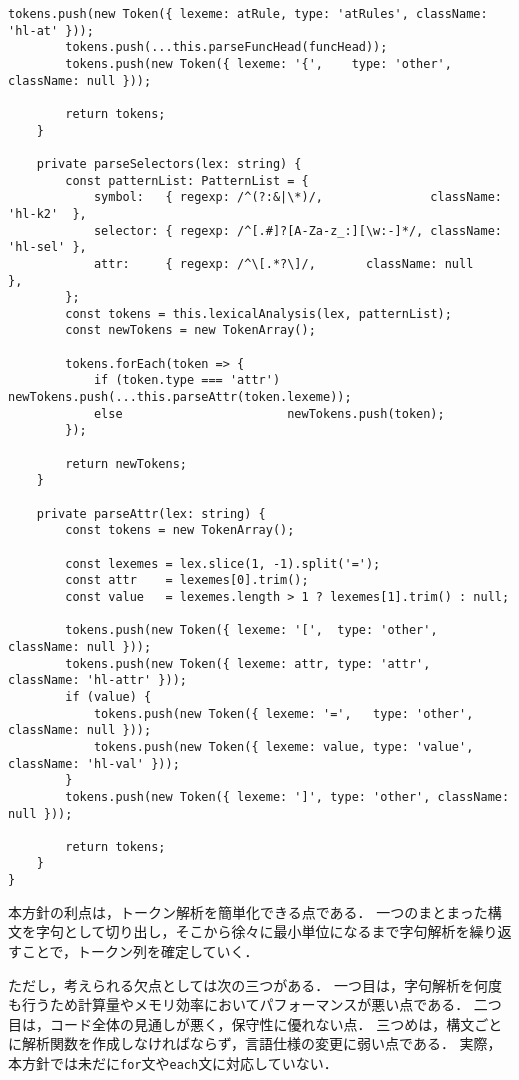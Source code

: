 \documentclass[autodetect-engine,dvi=dvipdfmx,ja=standard,
               a4j,11pt]{bxjsarticle}
\begin{document}
\begin{lstlisting}[caption={CSS/SCSSハイライタ({\tt scss.ts})(1)}, label={prog:scss1}]
        tokens.push(new Token({ lexeme: atRule, type: 'atRules', className: 'hl-at' }));
        tokens.push(...this.parseFuncHead(funcHead));
        tokens.push(new Token({ lexeme: '{',    type: 'other',   className: null }));

        return tokens;
    }

    private parseSelectors(lex: string) {
        const patternList: PatternList = {
            symbol:   { regexp: /^(?:&|\*)/,               className: 'hl-k2'  },
            selector: { regexp: /^[.#]?[A-Za-z_:][\w:-]*/, className: 'hl-sel' },
            attr:     { regexp: /^\[.*?\]/,       className: null     },
        };
        const tokens = this.lexicalAnalysis(lex, patternList);
        const newTokens = new TokenArray();

        tokens.forEach(token => {
            if (token.type === 'attr') newTokens.push(...this.parseAttr(token.lexeme));
            else                       newTokens.push(token);
        });

        return newTokens;
    }

    private parseAttr(lex: string) {
        const tokens = new TokenArray();

        const lexemes = lex.slice(1, -1).split('=');
        const attr    = lexemes[0].trim();
        const value   = lexemes.length > 1 ? lexemes[1].trim() : null;

        tokens.push(new Token({ lexeme: '[',  type: 'other', className: null }));
        tokens.push(new Token({ lexeme: attr, type: 'attr',  className: 'hl-attr' }));
        if (value) {
            tokens.push(new Token({ lexeme: '=',   type: 'other', className: null }));
            tokens.push(new Token({ lexeme: value, type: 'value', className: 'hl-val' }));
        }
        tokens.push(new Token({ lexeme: ']', type: 'other', className: null }));

        return tokens;
    }
}
\end{lstlisting}

本方針の利点は，トークン解析を簡単化できる点である．
一つのまとまった構文を字句として切り出し，そこから徐々に最小単位になるまで字句解析を繰り返すことで，トークン列を確定していく．

ただし，考えられる欠点としては次の三つがある．
一つ目は，字句解析を何度も行うため計算量やメモリ効率においてパフォーマンスが悪い点である．
二つ目は，コード全体の見通しが悪く，保守性に優れない点．
三つめは，構文ごとに解析関数を作成しなければならず，言語仕様の変更に弱い点である．
実際，本方針では未だに\verb|for|文や\verb|each|文に対応していない．
\end{document}
